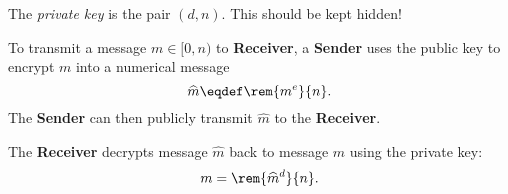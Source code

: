 \documentclass[handout]{mcs}
\begin{document}
{{\begin{description}
\begin{enumerate}
  The \emph{private key} is the pair $(d, n)$.  This should be kept
  hidden!

\end{enumerate}

\item[Encoding]

To transmit a message $m \in [0,n)$ to \textbf{Receiver}, a \textbf{Sender} uses the
  public key to encrypt $m$ into a numerical message
\[
\widehat{m} \eqdef \rem{m^e}{n}.
\]
The \textbf{Sender} can then publicly transmit $\widehat{m}$ to the
\textbf{Receiver}.

\item[Decoding] The \textbf{Receiver} decrypts message $\widehat{m}$
  back to message $m$ using the private key:
\[
m = \rem{\widehat{m}^d}{n}.
\]

\end{description}
}}
\end{document}
